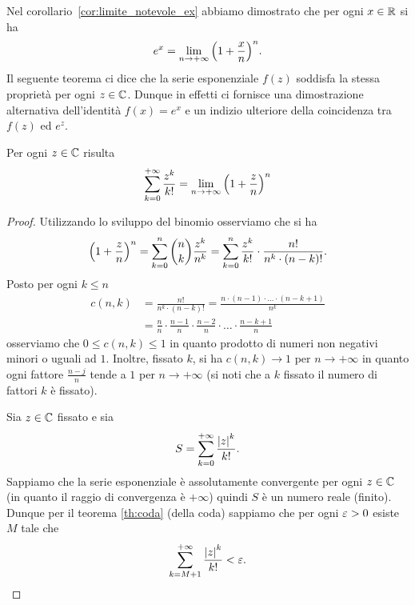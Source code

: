 Nel corollario~\ref{cor:limite_notevole_ex}
abbiamo dimostrato che 
per ogni $x\in {\mathbb R}$ si ha
\[
  e^x = \lim_{n\to +\infty} {\left( 1+\frac x n \right)}^n.  
\]
Il seguente teorema ci dice che la serie esponenziale $f(z)$ 
soddisfa la stessa proprietà per ogni $z \in {\mathbb C}$.
Dunque in effetti ci fornisce una dimostrazione 
alternativa dell'identità $f(x) = e^x$ e un indizio ulteriore 
della coincidenza tra $f(z)$ ed $e^z$.

\begin{theorem}%
\label{th:limite_notevole_esponenziale_complesso}%
\mymark{*}%
Per ogni $z\in {\mathbb C}$ risulta
\[
  \sum_{k=0}^{+\infty} \frac{z^k}{k!} = \lim_{n \to +\infty} {\left( 1+\frac z n \right)}^n  
\]
\end{theorem}
%
\begin{proof}
\mymark{*}
Utilizzando lo sviluppo del binomio osserviamo che si ha
\[
 {\left( 1+\frac z n \right)}^n
 = \sum_{k=0}^n \binom{n}{k} \frac{z^k}{n^k}
 = \sum_{k=0}^n \frac{z^k}{k!} \cdot \frac{n!}{n^k\cdot (n-k)!}.
\]
Posto per ogni $k\le n$
\begin{align*}
 c(n,k)
  &= \frac{n!}{n^k\cdot (n-k)!}
  = \frac{n \cdot (n-1) \cdot \ldots \cdot(n-k+1)}{n^k} \\
  &= \frac{n}{n}\cdot {\frac {n-1} n} \cdot \frac {n-2} {n} \cdot \ldots \cdot \frac{n-k+1}{n}
\end{align*}
osserviamo che $0\le c(n,k)\le 1$ in quanto
prodotto di numeri non negativi minori o uguali ad $1$.
Inoltre, fissato $k$, si ha $c(n,k)  \to 1$ per $n\to +\infty$
in quanto ogni fattore $\frac{n-j}{n}$ tende
a $1$ per $n\to +\infty$ (si noti che a $k$ fissato il numero di fattori $k$ è
fissato).


Sia $z\in {\mathbb C}$ fissato e sia
\[
  S = \sum_{k=0}^{+\infty} \frac{{\left|z\right|}^k}{k!}.
\]
Sappiamo che la serie esponenziale è assolutamente convergente
per ogni $z\in {\mathbb C}$ (in quanto il raggio di convergenza è $+\infty$)
quindi $S$ è un numero reale (finito).
Dunque per il teorema \ref{th:coda} (della coda) sappiamo che per ogni $\varepsilon>0$
esiste $M$ tale che
\[
   \sum_{k=M+1}^{+\infty} \frac{{\left|z\right|}^k}{k!} < \varepsilon.
\]


\end{proof}
